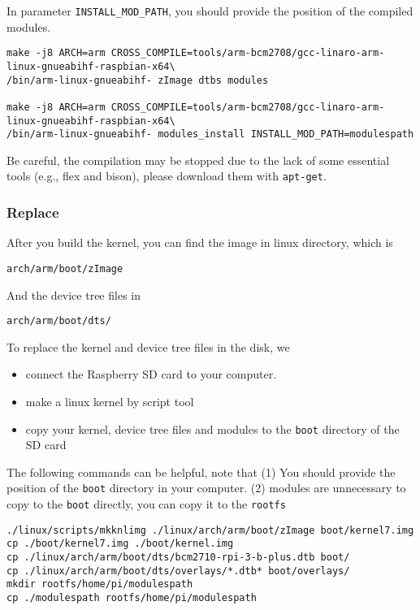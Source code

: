 In parameter \texttt{INSTALL\_MOD\_PATH}, you should provide the position of the compiled modules. 

\begin{lstlisting}
make -j8 ARCH=arm CROSS_COMPILE=tools/arm-bcm2708/gcc-linaro-arm-linux-gnueabihf-raspbian-x64\
/bin/arm-linux-gnueabihf- zImage dtbs modules

make -j8 ARCH=arm CROSS_COMPILE=tools/arm-bcm2708/gcc-linaro-arm-linux-gnueabihf-raspbian-x64\
/bin/arm-linux-gnueabihf- modules_install INSTALL_MOD_PATH=modulespath
\end{lstlisting}



Be careful, the compilation may be stopped due to the lack of some essential tools (e.g., flex and bison), please download them with \texttt{apt-get}.


\subsubsection{Replace}

After you build the kernel, you can find the image in linux directory, which is 
\begin{lstlisting}
arch/arm/boot/zImage
\end{lstlisting}

And the device tree files in 
\begin{lstlisting}
arch/arm/boot/dts/
\end{lstlisting}

To replace the kernel and device tree files in the disk, we 
\begin{itemize}
	\item connect the Raspberry SD card to your computer.
	\item make a linux kernel by script tool
	\item copy your kernel, device tree files and modules to the \texttt{boot} directory of the SD card
\end{itemize}


The following commands can be helpful, note that (1) You should provide the position of the \texttt{boot} directory in your computer. (2) modules are unnecessary to copy to the \texttt{boot} directly, you can copy it to the \texttt{rootfs}

\begin{lstlisting}
./linux/scripts/mkknlimg ./linux/arch/arm/boot/zImage boot/kernel7.img
cp ./boot/kernel7.img ./boot/kernel.img
cp ./linux/arch/arm/boot/dts/bcm2710-rpi-3-b-plus.dtb boot/
cp ./linux/arch/arm/boot/dts/overlays/*.dtb* boot/overlays/
mkdir rootfs/home/pi/modulespath
cp ./modulespath rootfs/home/pi/modulespath
\end{lstlisting}

